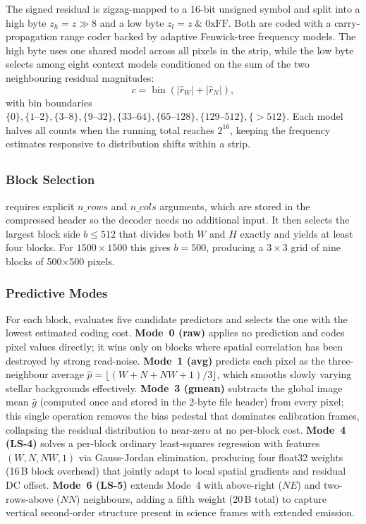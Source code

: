 The signed residual is zigzag-mapped to a 16-bit unsigned symbol and split
into a high byte $z_h = z \gg 8$ and a low byte $z_l = z\;\&\;0\text{xFF}$.
Both are coded with a carry-propagation range coder backed by adaptive
Fenwick-tree frequency models. The high byte uses one shared model across all
pixels in the strip, while the low byte selects among eight context models
conditioned on the sum of the two neighbouring residual magnitudes:
\[
  c = \operatorname{bin}(|\hat{r}_W| + |\hat{r}_N|),
\]
with bin boundaries $\{0\},\{1\text{--}2\},\{3\text{--}8\},\{9\text{--}32\},
\{33\text{--}64\},\{65\text{--}128\},\{129\text{--}512\},\{>512\}$.
Each model halves all counts when the running total reaches $2^{16}$, keeping
the frequency estimates responsive to distribution shifts within a strip.

\subsection{\allrounder{}}
\label{sec:balanced}

\subsubsection*{Block Selection}
\allrounder{} requires explicit $n\_rows$ and $n\_cols$ arguments, which are stored in
the compressed header so the decoder needs no additional input.
It then selects the largest block side $b\le512$ that divides both $W$ and $H$
exactly and yields at least four blocks. For $1500\times1500$ this gives
$b=500$, producing a $3\times3$ grid of nine blocks of 500$\times$500 pixels.

\subsubsection*{Predictive Modes}
For each block, \allrounder{} evaluates five candidate predictors and selects
the one with the lowest estimated coding cost. \textbf{Mode~0 (raw)} applies
no prediction and codes pixel values directly; it wins only on blocks where
spatial correlation has been destroyed by strong read-noise. \textbf{Mode~1
(avg)} predicts each pixel as the three-neighbour average
$\hat{p} = \lfloor(W+N+NW+1)/3\rfloor$, which smooths slowly varying stellar
backgrounds effectively. \textbf{Mode~3 (gmean)} subtracts the global image
mean $\bar{g}$ (computed once and stored in the 2-byte file header) from every
pixel; this single operation removes the bias pedestal that dominates
calibration frames, collapsing the residual distribution to near-zero at no
per-block cost. \textbf{Mode~4 (LS-4)} solves a per-block ordinary
least-squares regression with features $(W, N, NW, 1)$ via Gauss-Jordan
elimination, producing four float32 weights (16\,B block overhead) that
jointly adapt to local spatial gradients and residual DC offset.
\textbf{Mode~6 (LS-5)} extends Mode~4 with above-right ($NE$) and two-rows-above
($NN$) neighbours, adding a fifth weight (20\,B total) to capture vertical
second-order structure present in science frames with extended emission.

